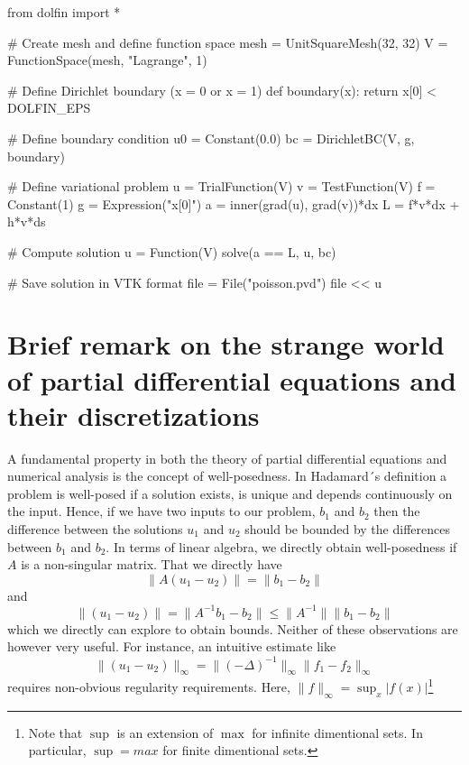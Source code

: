 \begin{python}
from dolfin import *

# Create mesh and define function space
mesh = UnitSquareMesh(32, 32)
V = FunctionSpace(mesh, "Lagrange", 1)

# Define Dirichlet boundary (x = 0 or x = 1)
def boundary(x): return x[0] < DOLFIN_EPS 

# Define boundary condition
u0 = Constant(0.0)
bc = DirichletBC(V, g, boundary)

# Define variational problem
u = TrialFunction(V)
v = TestFunction(V)
f = Constant(1)
g = Expression("x[0]")
a = inner(grad(u), grad(v))*dx
L = f*v*dx + h*v*ds

# Compute solution
u = Function(V)
solve(a == L, u, bc)

# Save solution in VTK format
file = File("poisson.pvd")
file << u
\end{python}

\section{Brief remark on the strange world of partial differential equations and their discretizations }

A fundamental property in both the theory of partial differential equations and numerical analysis is the
concept of well-posedness. In Hadamard´s definition a problem is well-posed if a solution exists, is unique
and depends continuously on the input. Hence, if we have two inputs to our problem, $b_1$ and $b_2$ 
then the difference between the solutions $u_1$ and $u_2$ should be bounded by the differences
between $b_1$ and $b_2$. In terms of linear algebra, we directly obtain well-posedness if
$A$ is a non-singular matrix. That we directly have 
\[
\|A(u_1 - u_2) \| = \|b_1 - b_2\|     
\]
and 
\[
\|(u_1 - u_2) \| = \|A^{-1}b_1 - b_2\| \le  \|A^{-1}\| \|b_1 - b_2\|     
\]
which we directly can explore to obtain bounds. Neither of these observations are however
very useful. 
For instance, an intuitive estimate like  
\[
\|(u_1 - u_2) \|_\infty = \|(-\Delta)^{-1} \|_\infty \|f_1 - f_2\|_\infty     
\]
requires non-obvious regularity requirements. Here, 
$\|f \|_\infty = \sup_x |f(x)|$\footnote{Note that $\sup$ is an 
extension of $\max$ for infinite dimentional sets. In particular, $\sup=max$ for finite dimentional sets.}  

